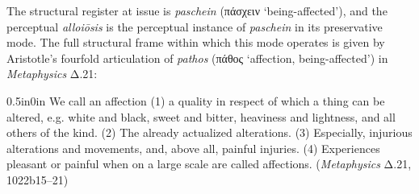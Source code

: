 \documentclass{article}
\newcommand{\gk}[1]{{\greekfont #1}}
\begin{document}
The structural register at issue is \textit{paschein} (\gk{πάσχειν} `being-affected'), and the perceptual \textit{alloiōsis} is the perceptual instance of \textit{paschein} in its preservative mode. The full structural frame within which this mode operates is given by Aristotle's fourfold articulation of \textit{pathos} (\gk{πάθος} `affection, being-affected') in \textit{Metaphysics} Δ.21:
\begin{adjustwidth}{0.5in}{0in}
We call an affection (1) a quality in respect of which a thing can be altered, e.g. white and black, sweet and bitter, heaviness and lightness, and all others of the kind. (2) The already actualized alterations. (3) Especially, injurious alterations and movements, and, above all, painful injuries. (4) Experiences pleasant or painful when on a large scale are called affections. (\textit{Metaphysics} Δ.21, 1022b15--21)
\end{adjustwidth}
\end{document}
